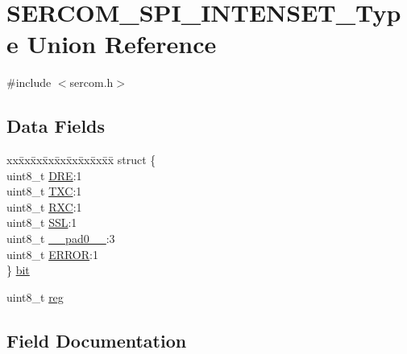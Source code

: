 \hypertarget{union_s_e_r_c_o_m___s_p_i___i_n_t_e_n_s_e_t___type}{}\section{S\+E\+R\+C\+O\+M\+\_\+\+S\+P\+I\+\_\+\+I\+N\+T\+E\+N\+S\+E\+T\+\_\+\+Type Union Reference}
\label{union_s_e_r_c_o_m___s_p_i___i_n_t_e_n_s_e_t___type}


{\ttfamily \#include $<$sercom.\+h$>$}

\subsection*{Data Fields}
\begin{DoxyCompactItemize}
\item 
\begin{tabbing}
xx\=xx\=xx\=xx\=xx\=xx\=xx\=xx\=xx\=\kill
struct \{\\
\>uint8\_t \mbox{\hyperlink{union_s_e_r_c_o_m___s_p_i___i_n_t_e_n_s_e_t___type_a5e4bea925be1d5304d58110ecc60f14e}{DRE}}:1\\
\>uint8\_t \mbox{\hyperlink{union_s_e_r_c_o_m___s_p_i___i_n_t_e_n_s_e_t___type_a8f012b40a2f5cf52b14d448b314b5cec}{TXC}}:1\\
\>uint8\_t \mbox{\hyperlink{union_s_e_r_c_o_m___s_p_i___i_n_t_e_n_s_e_t___type_ad465929f0a73cbdc2d5ab6b210909039}{RXC}}:1\\
\>uint8\_t \mbox{\hyperlink{union_s_e_r_c_o_m___s_p_i___i_n_t_e_n_s_e_t___type_ac2a5326783ce5e9d294fabed8aba7d3f}{SSL}}:1\\
\>uint8\_t \mbox{\hyperlink{union_s_e_r_c_o_m___s_p_i___i_n_t_e_n_s_e_t___type_a8b4eebe79ded0459acec2f4950102ba3}{\_\_pad0\_\_}}:3\\
\>uint8\_t \mbox{\hyperlink{union_s_e_r_c_o_m___s_p_i___i_n_t_e_n_s_e_t___type_a4be51829c8720b7d159b77c39924afaa}{ERROR}}:1\\
\} \mbox{\hyperlink{union_s_e_r_c_o_m___s_p_i___i_n_t_e_n_s_e_t___type_ab8d7a11faa803506a15e3f3c9bd566d7}{bit}}\\

\end{tabbing}\item 
uint8\+\_\+t \mbox{\hyperlink{union_s_e_r_c_o_m___s_p_i___i_n_t_e_n_s_e_t___type_a9428adc9af4653a2050e2536b55dec8d}{reg}}
\end{DoxyCompactItemize}


\subsection{Field Documentation}
\mbox{\label{union_s_e_r_c_o_m___s_p_i___i_n_t_e_n_s_e_t___type_a8b4eebe79ded0459acec2f4950102ba3}} 
